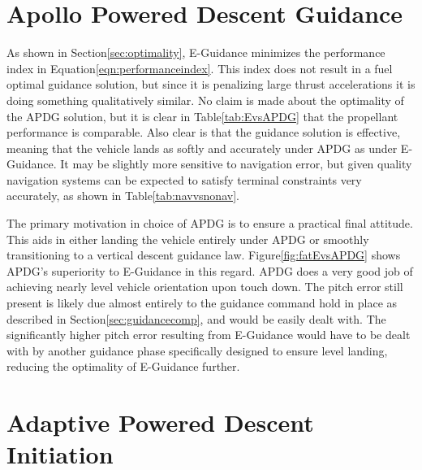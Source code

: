 \section{Apollo Powered Descent Guidance}

As shown in Section\:\ref{sec:optimality}, E-Guidance minimizes the performance index in Equation\:\ref{eqn:performanceindex}. This index does not result in a fuel optimal guidance solution, but since it is penalizing large thrust accelerations it is doing something qualitatively similar. No claim is made about the optimality of the APDG solution, but it is clear in Table\:\ref{tab:EvsAPDG} that the propellant performance is comparable. Also clear is that the guidance solution is effective, meaning that the vehicle lands as softly and accurately under APDG as under E-Guidance. It may be slightly more sensitive to navigation error, but given quality navigation systems can be expected to satisfy terminal constraints very accurately, as shown in Table\:\ref{tab:navvsnonav}.

The primary motivation in choice of APDG is to ensure a practical final attitude. This aids in either landing the vehicle entirely under APDG or smoothly transitioning to a vertical descent guidance law. Figure\:\ref{fig:fatEvsAPDG} shows APDG's superiority to E-Guidance in this regard. APDG does a very good job of achieving nearly level vehicle orientation upon touch down. The pitch error still present is likely due almost entirely to the guidance command hold in place as described in Section\:\ref{sec:guidancecomp}, and would be easily dealt with. The significantly higher pitch error resulting from E-Guidance would have to be dealt with by another guidance phase specifically designed to ensure level landing, reducing the optimality of E-Guidance further.

\section{Adaptive Powered Descent Initiation} \label{sec:PDIdisc}

